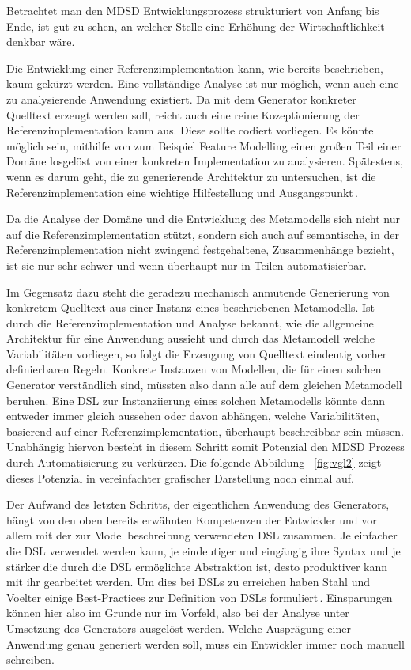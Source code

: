 \documentclass[12pt,oneside,a4paper,parskip]{scrbook}
\begin{document}
Betrachtet man den MDSD Entwicklungsprozess strukturiert von Anfang bis Ende, ist gut zu sehen, an welcher Stelle eine Erhöhung der Wirtschaftlichkeit denkbar wäre.

Die Entwicklung einer Referenzimplementation kann, wie bereits beschrieben, kaum gekürzt werden. Eine vollständige Analyse ist nur möglich, wenn auch eine zu analysierende Anwendung existiert. Da mit dem Generator konkreter Quelltext erzeugt werden soll, reicht auch eine reine Kozeptionierung der Referenzimplementation kaum aus. Diese sollte codiert vorliegen. Es könnte möglich sein, mithilfe von zum Beispiel Feature Modelling einen großen Teil einer Domäne losgelöst von einer konkreten Implementation zu analysieren. Spätestens, wenn es darum geht, die zu generierende Architektur zu untersuchen, ist die Referenzimplementation eine wichtige Hilfestellung und Ausgangspunkt\,\cite[S. 123f.]{stahl2007}.

Da die Analyse der Domäne und die Entwicklung des Metamodells sich nicht nur auf die Referenzimplementation stützt, sondern sich auch auf semantische, in der Referenzimplementation nicht zwingend festgehaltene, Zusammenhänge bezieht, ist sie nur sehr schwer und wenn überhaupt nur in Teilen automatisierbar.

Im Gegensatz dazu steht die geradezu mechanisch anmutende Generierung von konkretem Quelltext aus einer Instanz eines beschriebenen Metamodells. Ist durch die Referenzimplementation und Analyse bekannt, wie die allgemeine Architektur für eine Anwendung aussieht und durch das Metamodell welche Variabilitäten vorliegen, so folgt die Erzeugung von Quelltext eindeutig vorher definierbaren Regeln. Konkrete Instanzen von Modellen, die für einen solchen Generator verständlich sind, müssten also dann alle auf dem gleichen Metamodell beruhen. Eine DSL zur Instanziierung eines solchen Metamodells könnte dann entweder immer gleich aussehen oder davon abhängen, welche Variabilitäten, basierend auf einer Referenzimplementation, überhaupt beschreibbar sein müssen. Unabhängig hiervon besteht in diesem Schritt somit Potenzial den MDSD Prozess durch Automatisierung zu verkürzen. Die folgende Abbildung ~\ref{fig:vgl2} zeigt dieses Potenzial in vereinfachter grafischer Darstellung noch einmal auf.

Der Aufwand des letzten Schritts, der eigentlichen Anwendung des Generators, hängt von den oben bereits erwähnten Kompetenzen der Entwickler und vor allem mit der zur Modellbeschreibung verwendeten DSL zusammen. Je einfacher die DSL verwendet werden kann, je eindeutiger und eingängig ihre Syntax und je stärker die durch die DSL ermöglichte Abstraktion ist, desto produktiver kann mit ihr gearbeitet werden. Um dies bei DSLs zu erreichen haben Stahl und Voelter einige Best-Practices zur Definition von DSLs formuliert\,\cite[S. 113]{stahl2007}. Einsparungen können hier also im Grunde nur im Vorfeld, also bei der Analyse unter Umsetzung des Generators ausgelöst werden. Welche Ausprägung einer Anwendung genau generiert werden soll, muss ein Entwickler immer noch manuell schreiben.
\end{document}
